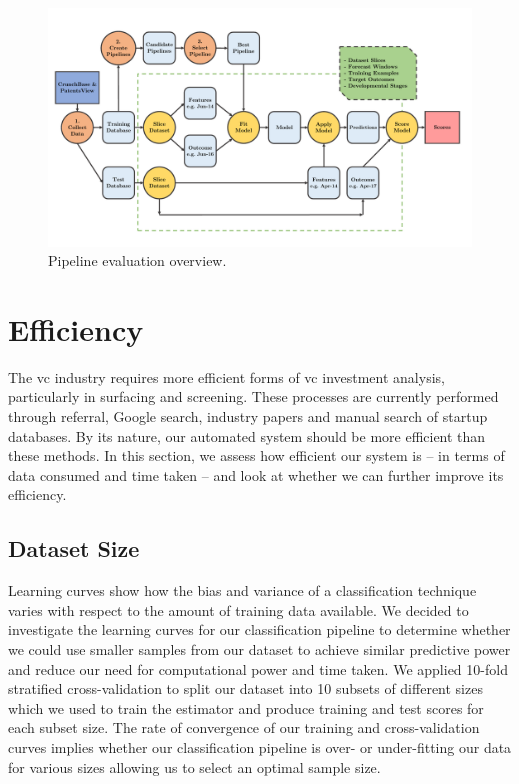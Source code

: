\documentclass[../thesis/thesis.tex]{subfiles}
\begin{document}
\begin{figure}[!htb]
    \centering
    \includegraphics[width=\textwidth]{../figures/evaluation/flowchart_evaluation}
    \caption[Pipeline evaluation flowchart]{Pipeline evaluation overview.}
    \label{fig:evaluation:pipeline_evaluation}
\end{figure}

\section{Efficiency}

The \gls{vc} industry requires more efficient forms of \gls{vc} investment analysis, particularly in surfacing and screening. These processes are currently performed through referral, Google search, industry papers and manual search of startup databases. By its nature, our automated system should be more efficient than these methods. In this section, we assess how efficient our system is -- in terms of data consumed and time taken -- and look at whether we can further improve its efficiency.

\subsection{Dataset Size}

Learning curves show how the bias and variance of a classification technique varies with respect to the amount of training data available. We decided to investigate the learning curves for our classification pipeline to determine whether we could use smaller samples from our dataset to achieve similar predictive power and reduce our need for computational power and time taken. We applied 10-fold stratified cross-validation to split our dataset into 10 subsets of different sizes which we used to train the estimator and produce training and test scores for each subset size. The rate of convergence of our training and cross-validation curves implies whether our classification pipeline is over- or under-fitting our data for various sizes allowing us to select an optimal sample size.
\end{document}

